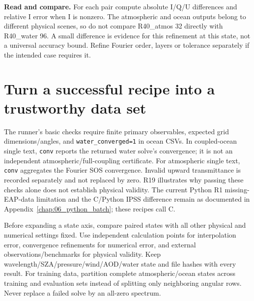 \textbf{Read and compare. }For each pair compute absolute I/Q/U differences and relative I error when I is nonzero. The atmospheric and ocean outputs belong to different physical scenes, so do not compare R40\_atmos 32 directly with R40\_water 96. A small difference is evidence for this refinement at this state, not a universal accuracy bound. Refine Fourier order, layers or tolerance separately if the intended case requires it.

\section{Turn a successful recipe into a trustworthy data set}
\label{sec:auto:09_cookbook:8}

The runner's basic checks require finite primary observables, expected grid dimensions/angles, and \texttt{water\_\allowbreak{}converged=\allowbreak{}1} in ocean CSVs. In coupled-ocean single text, \texttt{conv} reports the returned water solve's convergence; it is not an independent atmospheric/full-coupling certificate. For atmospheric single text, \texttt{conv} aggregates the Fourier SOS convergence. Invalid upward transmittance is recorded separately and not replaced by zero. R19 illustrates why passing these checks alone does not establish physical validity. The current Python R1 missing-EAP-data limitation and the C/Python IPSS difference remain as documented in Appendix~\ref{chap:06_python_batch}; these recipes call C.

Before expanding a state axis, compare paired states with all other physical and numerical settings fixed. Use independent calculation points for interpolation error, convergence refinements for numerical error, and external observations/benchmarks for physical validity. Keep wavelength/SZA/pressure/wind/AOD/water state and file hashes with every result. For training data, partition complete atmospheric/ocean states across training and evaluation sets instead of splitting only neighboring angular rows. Never replace a failed solve by an all-zero spectrum.
